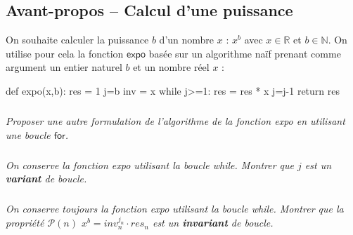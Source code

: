 \documentclass[10pt]{article}
\begin{document}



\subsection*{Avant-propos -- Calcul d'une puissance}
On souhaite calculer la puissance $b$ d'un nombre $x$ : $x^b$ avec $x\in\mathbb{R}$ et $b\in\mathbb{N}$. On utilise pour cela la fonction $\textsf{expo}$ basée sur un algorithme naïf prenant comme argument un entier naturel $b$ et un nombre réel $x$ :

\begin{py}
\begin{python}
def expo(x,b):
    res = 1
    j=b
    inv = x
    while j>=1:
        res = res * x
        j=j-1
    return res
\end{python}
\end{py}


\subparagraph{}
\textit{Proposer une autre formulation de l'algorithme de la fonction \textsf{expo} en utilisant une boucle $\textsf{for}$.}

\subparagraph{}
\textit{On conserve la fonction \textsf{expo} utilisant la boucle \textsf{while}. Montrer que $j$ est un \textbf{variant} de boucle.}


\subparagraph{}
\textit{On conserve toujours la fonction \textsf{expo} utilisant la boucle \textsf{while}. Montrer que la propriété $\mathcal{P}(n)$ $x^b = inv_n^{j_n}\cdot res_n$ est un \textbf{invariant} de boucle.}
\end{document}
